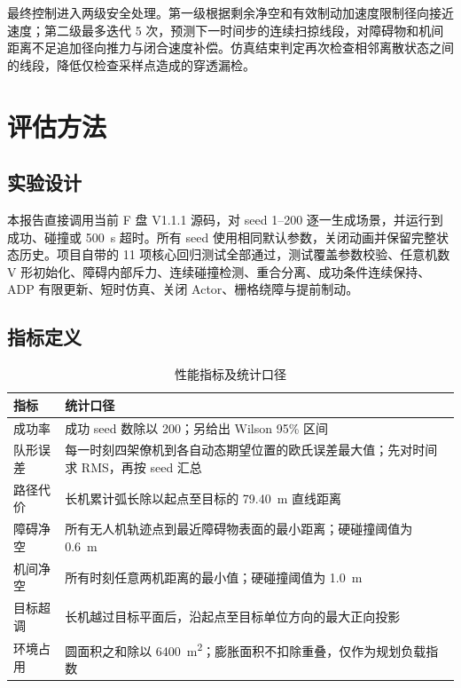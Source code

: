 \documentclass[UTF8,a4paper,12pt,fontset=windows]{ctexart}
\begin{document}
最终控制进入两级安全处理。第一级根据剩余净空和有效制动加速度限制径向接近速度；第二级最多迭代 5 次，预测下一时间步的连续扫掠线段，对障碍物和机间距离不足追加径向推力与闭合速度补偿。仿真结束判定再次检查相邻离散状态之间的线段，降低仅检查采样点造成的穿透漏检。

\section{评估方法}

\subsection{实验设计}

本报告直接调用当前 F 盘 V1.1.1 源码，对 seed 1--200 逐一生成场景，并运行到成功、碰撞或 \SI{500}{s} 超时。所有 seed 使用相同默认参数，关闭动画并保留完整状态历史。项目自带的 11 项核心回归测试全部通过，测试覆盖参数校验、任意机数 V 形初始化、障碍内部斥力、连续碰撞检测、重合分离、成功条件连续保持、ADP 有限更新、短时仿真、关闭 Actor、栅格绕障与提前制动。

\subsection{指标定义}

\begin{table}[H]
\centering
\caption{性能指标及统计口径}
\label{tab:metrics}
\small
\begin{tabularx}{\textwidth}{@{}C{2.5cm}Y@{}}
\toprule
指标 & 统计口径 \\
\midrule
成功率 & 成功 seed 数除以 200；另给出 Wilson 95\% 区间 \\
队形误差 & 每一时刻四架僚机到各自动态期望位置的欧氏误差最大值；先对时间求 RMS，再按 seed 汇总 \\
路径代价 & 长机累计弧长除以起点至目标的 \SI{79.40}{m} 直线距离 \\
障碍净空 & 所有无人机轨迹点到最近障碍物表面的最小距离；硬碰撞阈值为 \SI{0.6}{m} \\
机间净空 & 所有时刻任意两机距离的最小值；硬碰撞阈值为 \SI{1.0}{m} \\
目标超调 & 长机越过目标平面后，沿起点至目标单位方向的最大正向投影 \\
环境占用 & 圆面积之和除以 \SI{6400}{m^2}；膨胀面积不扣除重叠，仅作为规划负载指数 \\
\bottomrule
\end{tabularx}
\end{table}
\end{document}
